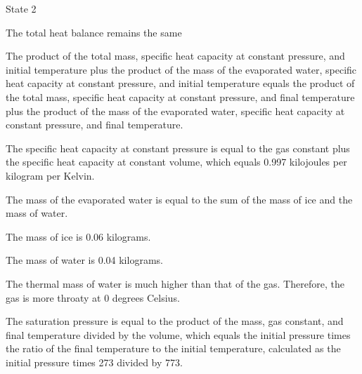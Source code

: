 State 2

The total heat balance remains the same

The product of the total mass, specific heat capacity at constant pressure, and initial temperature plus the product of the mass of the evaporated water, specific heat capacity at constant pressure, and initial temperature equals the product of the total mass, specific heat capacity at constant pressure, and final temperature plus the product of the mass of the evaporated water, specific heat capacity at constant pressure, and final temperature.

The specific heat capacity at constant pressure is equal to the gas constant plus the specific heat capacity at constant volume, which equals 0.997 kilojoules per kilogram per Kelvin.

The mass of the evaporated water is equal to the sum of the mass of ice and the mass of water.

The mass of ice is 0.06 kilograms.

The mass of water is 0.04 kilograms.

The thermal mass of water is much higher than that of the gas. Therefore, the gas is more throaty at 0 degrees Celsius.

The saturation pressure is equal to the product of the mass, gas constant, and final temperature divided by the volume, which equals the initial pressure times the ratio of the final temperature to the initial temperature, calculated as the initial pressure times 273 divided by 773.